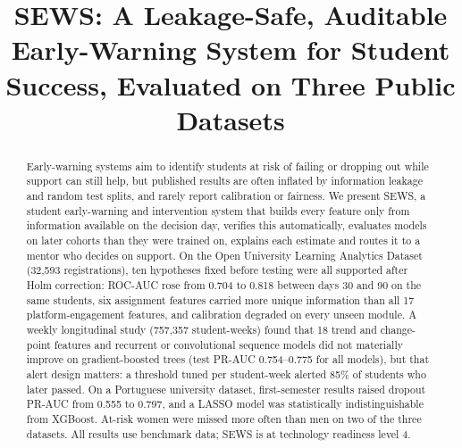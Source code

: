 \documentclass[conference]{IEEEtran}
\begin{document}
\title{SEWS: A Leakage-Safe, Auditable Early-Warning System for Student Success, Evaluated on Three Public Datasets}

\author{
\IEEEauthorblockN{[Author 1]}
\and
\IEEEauthorblockN{[Author 2]}
\and
\IEEEauthorblockN{[Guide]}
}

\maketitle

\begin{abstract}
Early-warning systems aim to identify students at risk of failing or dropping out while support can still help,
but published results are often inflated by information leakage and random test splits, and rarely report
calibration or fairness. We present SEWS, a student early-warning and intervention system that builds every
feature only from information available on the decision day, verifies this automatically, evaluates models on
later cohorts than they were trained on, explains each estimate and routes it to a mentor who decides on support.
On the Open University Learning Analytics Dataset (32,593 registrations), ten hypotheses fixed before testing were
all supported after Holm correction: ROC-AUC rose from 0.704 to 0.818 between days 30 and 90 on the same students,
six assignment features carried more unique information than all 17 platform-engagement features, and calibration
degraded on every unseen module. A weekly longitudinal study (757,357 student-weeks) found that 18 trend and
change-point features and recurrent or convolutional sequence models did not materially improve on gradient-boosted
trees (test PR-AUC 0.754--0.775 for all models), but that alert design matters: a threshold tuned per student-week
alerted 85\% of students who later passed. On a Portuguese university dataset, first-semester results raised
dropout PR-AUC from 0.555 to 0.797, and a LASSO model was statistically indistinguishable from XGBoost. At-risk
women were missed more often than men on two of the three datasets. All results use benchmark data; SEWS is at
technology readiness level 4.
\end{abstract}
\end{document}

